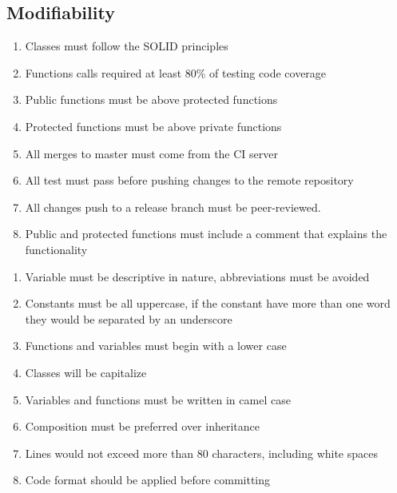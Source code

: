 \subsection{Modifiability}
\begin{enumerate}[label=MOD-\arabic*]
    \item Classes must follow the SOLID principles \cite{solid}
    \item Functions calls required at least 80\% of testing code coverage
    \item Public functions must be above protected functions
    \item Protected functions must be above private functions
    \item All merges to master must come from the CI server
    \item All test must pass before pushing changes to the remote repository
    \item All changes push to a release branch must be peer-reviewed.
    \item Public and protected functions must include a comment that explains 
    the functionality
\end{enumerate}
\pagebreak
\begin{enumerate}[resume, label=MOD-\arabic*]
    \item Variable must be descriptive in nature, abbreviations must be avoided
    \item Constants must be all uppercase, if the constant have more than one 
    word they would be separated by an underscore
    \item Functions and variables must begin with a lower case
    \item Classes will be capitalize
    \item Variables and functions must be written in camel case
    \item Composition must be preferred over inheritance
    \item Lines would not exceed more than 80 characters, including white 
    spaces
    \item Code format should be applied before committing
\end{enumerate}

